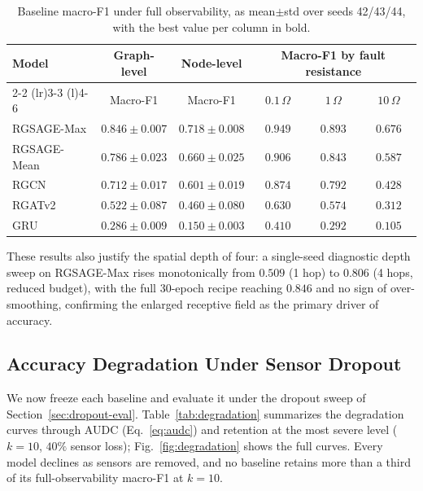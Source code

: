 \documentclass[3p,times,procedia]{elsarticle}
\begin{document}
\begin{table}[!tb]
\centering
\caption{Baseline macro-F1 under full observability, as mean$\pm$std over seeds 42/43/44, with the best value per column in bold.}

\label{tab:baseline}
\footnotesize
\begin{tabular}{@{}lccccc@{}}
\toprule
\multirow{2}{*}{Model} &
\multicolumn{1}{c}{Graph-level} &
\multicolumn{1}{c}{Node-level} &
\multicolumn{3}{c}{Macro-F1 by fault resistance} \\
\cmidrule(lr){2-2}
\cmidrule(lr){3-3}
\cmidrule(l){4-6}
&
Macro-F1 &
Macro-F1 &
$0.1\,\Omega$ &
$1\,\Omega$ &
$10\,\Omega$ \\
\midrule
RGSAGE-Max
& $\mathbf{0.846 \pm 0.007}$
& $\mathbf{0.718 \pm 0.008}$
& $\mathbf{0.949}$
& $\mathbf{0.893}$
& $\mathbf{0.676}$ \\

RGSAGE-Mean
& $0.786 \pm 0.023$
& $0.660 \pm 0.025$
& $0.906$
& $0.843$
& $0.587$ \\

RGCN
& $0.712 \pm 0.017$
& $0.601 \pm 0.019$
& $0.874$
& $0.792$
& $0.428$ \\

RGATv2
& $0.522 \pm 0.087$
& $0.460 \pm 0.080$
& $0.630$
& $0.574$
& $0.312$ \\

GRU
& $0.286 \pm 0.009$
& $0.150 \pm 0.003$
& $0.410$
& $0.292$
& $0.105$ \\
\bottomrule
\end{tabular}
\end{table}

These results also justify the spatial depth of four: a single-seed diagnostic depth sweep on RGSAGE-Max rises monotonically from $0.509$ (1 hop) to $0.806$ (4 hops, reduced budget), with the full 30-epoch recipe reaching $0.846$ and no sign of over-smoothing, confirming the enlarged receptive field as the primary driver of accuracy.

\subsection{Accuracy Degradation Under Sensor Dropout}
\label{sec:res-degrade}

We now freeze each baseline and evaluate it under the dropout sweep of Section~\ref{sec:dropout-eval}. Table~\ref{tab:degradation} summarizes the degradation curves through AUDC (Eq.~\eqref{eq:audc}) and retention at the most severe level ($k=10$, $40\%$ sensor loss); Fig.~\ref{fig:degradation} shows the full curves. Every model declines as sensors are removed, and no baseline retains more than a third of its full-observability macro-F1 at $k=10$.
\end{document}
